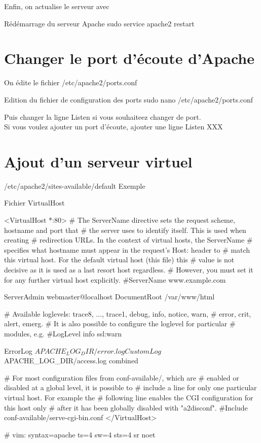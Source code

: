 Enfin, on actualise le serveur avec

\begin{Bash}{Rédémarrage du serveur Apache}
sudo service apache2 restart
\end{Bash}

\section{Changer le port d'écoute d'Apache}

On édite le fichier /etc/apache2/ports.conf

\begin{Bash}{Edition du fichier de configuration des ports}
sudo nano /etc/apache2/ports.conf
\end{Bash}
Puis changer la ligne Listen si vous souhaiteez changer de port.\\
Si vous voulez ajouter un port d'écoute, ajouter une ligne Listen XXX


\section{Ajout d'un serveur virtuel}

/etc/apache2/sites-available/default
Exemple
\begin{Bash}{Fichier VirtualHost}


<VirtualHost *:80>
        # The ServerName directive sets the request scheme, hostname and port that
        # the server uses to identify itself. This is used when creating
        # redirection URLs. In the context of virtual hosts, the ServerName
        # specifies what hostname must appear in the request's Host: header to
        # match this virtual host. For the default virtual host (this file) this
        # value is not decisive as it is used as a last resort host regardless.
        # However, you must set it for any further virtual host explicitly.
        #ServerName www.example.com

        ServerAdmin webmaster@localhost
        DocumentRoot /var/www/html

        # Available loglevels: trace8, ..., trace1, debug, info, notice, warn,
        # error, crit, alert, emerg.
        # It is also possible to configure the loglevel for particular
        # modules, e.g.
        #LogLevel info ssl:warn

        ErrorLog ${APACHE_LOG_DIR}/error.log
        CustomLog ${APACHE_LOG_DIR}/access.log combined

        # For most configuration files from conf-available/, which are
        # enabled or disabled at a global level, it is possible to
        # include a line for only one particular virtual host. For example the
        # following line enables the CGI configuration for this host only
        # after it has been globally disabled with "a2disconf".
        #Include conf-available/serve-cgi-bin.conf
</VirtualHost>

# vim: syntax=apache ts=4 sw=4 sts=4 sr noet

\end{Bash}


